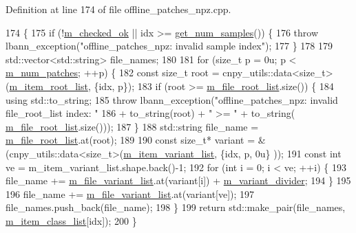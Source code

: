 Definition at line 174 of file offline\+\_\+patches\+\_\+npz.\+cpp.


\begin{DoxyCode}
174                                                                                   \{
175   \textcolor{keywordflow}{if} (!\hyperlink{classlbann_1_1offline__patches__npz_ab434320c2084790a2c99257d6c39fc85}{m\_checked\_ok} || idx >= \hyperlink{classlbann_1_1offline__patches__npz_aa6fa05575f54a29b67d0bba8a2a9d363}{get\_num\_samples}()) \{
176     \textcolor{keywordflow}{throw} lbann\_exception(\textcolor{stringliteral}{"offline\_patches\_npz: invalid sample index"});
177   \}
178 
179   std::vector<std::string> file\_names;
180 
181   \textcolor{keywordflow}{for} (\textcolor{keywordtype}{size\_t} p = 0u; p < \hyperlink{classlbann_1_1offline__patches__npz_a5c13583d344641295301f82a32ebee41}{m\_num\_patches}; ++p) \{
182     \textcolor{keyword}{const} \textcolor{keywordtype}{size\_t} root = cnpy\_utils::data<size\_t>(\hyperlink{classlbann_1_1offline__patches__npz_a5d61c89e80f8e67b4850fb72792ce862}{m\_item\_root\_list}, \{idx, p\});
183     \textcolor{keywordflow}{if} (root >= \hyperlink{classlbann_1_1offline__patches__npz_a515ef05ef0679f3b6f1197d1ab47bfb3}{m\_file\_root\_list}.size()) \{
184       \textcolor{keyword}{using} std::to\_string;
185       \textcolor{keywordflow}{throw} lbann\_exception(\textcolor{stringliteral}{"offline\_patches\_npz: invalid file\_root\_list index: "}
186                           + to\_string(root) + \textcolor{stringliteral}{" >= "} + to\_string(
      \hyperlink{classlbann_1_1offline__patches__npz_a515ef05ef0679f3b6f1197d1ab47bfb3}{m\_file\_root\_list}.size()));
187     \}
188     std::string file\_name = \hyperlink{classlbann_1_1offline__patches__npz_a515ef05ef0679f3b6f1197d1ab47bfb3}{m\_file\_root\_list}.at(root);
189 
190     \textcolor{keyword}{const} \textcolor{keywordtype}{size\_t}* variant = &(cnpy\_utils::data<size\_t>(\hyperlink{classlbann_1_1offline__patches__npz_a5aec35e7b2f9956b8e7e8ce5cbb3ff22}{m\_item\_variant\_list}, \{idx, p, 0u\}
      ));
191     \textcolor{keyword}{const} \textcolor{keywordtype}{int} ve = m\_item\_variant\_list.shape.back()-1;
192     \textcolor{keywordflow}{for} (\textcolor{keywordtype}{int} i = 0; i < ve; ++i) \{
193       file\_name += \hyperlink{classlbann_1_1offline__patches__npz_a164d2bd134dc8c3946dc28d6ec5da0ec}{m\_file\_variant\_list}.at(variant[i]) + 
      \hyperlink{classlbann_1_1offline__patches__npz_aaab0b9040ce248875b6cdb430e054b3a}{m\_variant\_divider};
194     \}
195 
196     file\_name += \hyperlink{classlbann_1_1offline__patches__npz_a164d2bd134dc8c3946dc28d6ec5da0ec}{m\_file\_variant\_list}.at(variant[ve]);
197     file\_names.push\_back(file\_name);
198   \}
199   \textcolor{keywordflow}{return} std::make\_pair(file\_names, \hyperlink{classlbann_1_1offline__patches__npz_a5f90dc1b898f8ad9d7ea16c188738419}{m\_item\_class\_list}[idx]);
200 \}
\end{DoxyCode}

